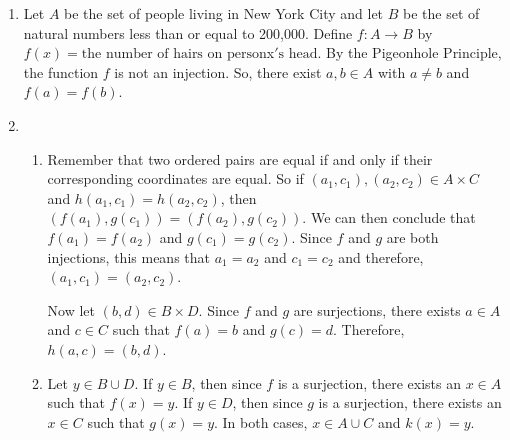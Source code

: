 \begin{enumerate}
\item Let $A$ be the set of people living in New York City and let $B$ be the set of natural numbers less than or equal to 200,000.  Define \linebreak
$f: A \to B$ by $f \left( x \right) = \text{the number of hairs on person} $x$'\text{s head}$.  By the Pigeonhole Principle, the function $f$ is not an injection.  So, there exist $a, b \in A$ with $a \ne b$ and 
$f \left( a \right) = f \left( b \right)$.


\item \begin{enumerate}
\item Remember that two ordered pairs are equal if and only if their corresponding coordinates are equal.  So if $\left( a_1, c_1 \right) , \left( a_2, c_2 \right) \in A \times C$ and $h \left( a_1, c_1 \right) = h \left( a_2, c_2 \right)$, then 
$\left( f \left( a_1 \right), g \left( c_1 \right) \right) = 
\left( f \left( a_2 \right), g \left( c_2 \right) \right)$.  We can then conclude that 
$f \left( a_1 \right) = f \left( a_2 \right)$ and $g \left( c_1 \right) = g \left( c_2 \right)$.  Since $f$ and $g$ are both injections, this means that $a_1 = a_2$ and $c_1 = c_2$ and therefore, 
$\left( a_1, c_1 \right) = \left( a_2, c_2 \right)$.

Now let $\left( b, d \right) \in B \times D$.  Since $f$ and $g$ are surjections, there exists 
$a \in A$ and $c \in C$ such that $f \left( a \right) = b$ and $g \left( c \right) = d$.  Therefore, $h \left( a, c \right) = \left( b, d \right)$.

\item Let $y \in B \cup D$.  If $y \in B$, then since $f$ is a surjection, there exists an 
$x \in A$ such that $f \left( x \right) = y$.  If $y \in D$, then since $g$ is a surjection, there exists an $x \in C$ such that $g \left( x \right) = y$.  In both cases, $x \in A \cup C$ and 
$k \left( x \right) = y$.


\end{enumerate}
\end{enumerate}
